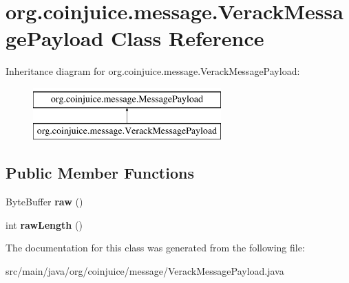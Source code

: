 \hypertarget{classorg_1_1coinjuice_1_1message_1_1_verack_message_payload}{\section{org.\-coinjuice.\-message.\-Verack\-Message\-Payload Class Reference}
\label{classorg_1_1coinjuice_1_1message_1_1_verack_message_payload}
}
Inheritance diagram for org.\-coinjuice.\-message.\-Verack\-Message\-Payload\-:\begin{figure}[H]
\begin{center}
\leavevmode
\includegraphics[height=2.000000cm]{classorg_1_1coinjuice_1_1message_1_1_verack_message_payload}
\end{center}
\end{figure}
\subsection*{Public Member Functions}
\begin{DoxyCompactItemize}
\item 
\hypertarget{classorg_1_1coinjuice_1_1message_1_1_verack_message_payload_aacec9ef4604d9511c166c3f7787647db}{Byte\-Buffer {\bfseries raw} ()}\label{classorg_1_1coinjuice_1_1message_1_1_verack_message_payload_aacec9ef4604d9511c166c3f7787647db}

\item 
\hypertarget{classorg_1_1coinjuice_1_1message_1_1_verack_message_payload_a60d1f6c78d62aa42d74213428fa83608}{int {\bfseries raw\-Length} ()}\label{classorg_1_1coinjuice_1_1message_1_1_verack_message_payload_a60d1f6c78d62aa42d74213428fa83608}

\end{DoxyCompactItemize}


The documentation for this class was generated from the following file\-:\begin{DoxyCompactItemize}
\item 
src/main/java/org/coinjuice/message/Verack\-Message\-Payload.\-java\end{DoxyCompactItemize}
